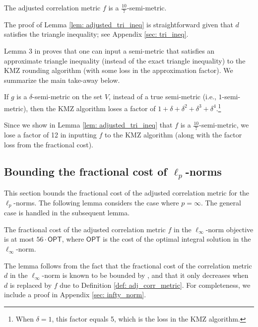 \begin{lemma} \label{lem: adjusted_tri_ineq}
    The adjusted correlation metric $f$ is a $\frac{10}{7}$-semi-metric. 
\end{lemma}

The proof of Lemma \ref{lem: adjusted_tri_ineq} is straightforward given that $d$ satisfies the triangle inequality; see Appendix \ref{sec: tri_ineq}. 


Lemma 3 in \cite{DMN23} proves that one can input a semi-metric that satisfies an approximate triangle inequality (instead of the exact triangle inequality) to the KMZ rounding algorithm (with some loss in the approximation factor). We summarize the main take-away below.


\begin{lemma}\label{lem: apx-tri}
    If $g$ is a $\delta$-semi-metric on the set $V$, instead of a true  semi-metric (i.e., $1$-semi-metric), then the KMZ algorithm loses a factor of $1+\delta+\delta^2+\delta^3+\delta^4$.\footnote{When $\delta =1$, this factor equals 5, which is the loss in the KMZ algorithm.}
\end{lemma}
Since we show in Lemma \ref{lem: adjusted_tri_ineq} that $f$ is a $\frac{10}{7}$-semi-metric,
we lose a factor of 12 in inputting $f$ to the KMZ algorithm (along with the factor loss from the fractional cost).



\subsection{Bounding the fractional cost of $\ell_p$-norms}\label{sec: lp-norm}
This section bounds the fractional cost of the adjusted correlation metric for the $\ell_p$-norms.  The following lemma considers the case where $p=\infty$.  The general case is handled in the subsequent lemma.

\begin{lemma} \label{lem: infty_proof}
    The fractional cost of the adjusted correlation metric $f$ in the $\ell_{\infty}$-norm objective is at most $56 \cdot \textsf{OPT}$, where $\textsf{OPT}$ is the cost of the optimal integral solution in the $\ell_{\infty}$-norm.
\end{lemma}

The lemma follows from the fact that the fractional cost of the correlation metric $d$ in the $\ell_{\infty}$-norm is known to be bounded by \cite{DMN23}, and that it only decreases when $d$ is replaced by $f$ due to Definition \ref{def: adj_corr_metric}. For completeness, we include a proof in Appendix \ref{sec: infty_norm}. 

